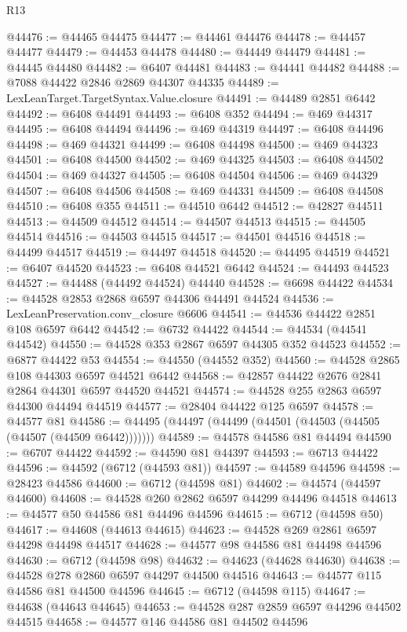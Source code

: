 \begin{lexlean}{R13}
\begin{coremodule}
@44476 := @44465 @44475
@44477 := @44461 @44476
@44478 := @44457 @44477
@44479 := @44453 @44478
@44480 := @44449 @44479
@44481 := @44445 @44480
@44482 := @6407 @44481
@44483 := @44441 @44482
@44488 := @7088 @44422 @2846 @2869 @44307 @44335
@44489 := LexLeanTarget.TargetSyntax.Value.closure
@44491 := @44489 @2851 @6442
@44492 := @6408 @44491
@44493 := @6408 @352
@44494 := @469 @44317
@44495 := @6408 @44494
@44496 := @469 @44319
@44497 := @6408 @44496
@44498 := @469 @44321
@44499 := @6408 @44498
@44500 := @469 @44323
@44501 := @6408 @44500
@44502 := @469 @44325
@44503 := @6408 @44502
@44504 := @469 @44327
@44505 := @6408 @44504
@44506 := @469 @44329
@44507 := @6408 @44506
@44508 := @469 @44331
@44509 := @6408 @44508
@44510 := @6408 @355
@44511 := @44510 @6442
@44512 := @42827 @44511
@44513 := @44509 @44512
@44514 := @44507 @44513
@44515 := @44505 @44514
@44516 := @44503 @44515
@44517 := @44501 @44516
@44518 := @44499 @44517
@44519 := @44497 @44518
@44520 := @44495 @44519
@44521 := @6407 @44520
@44523 := @6408 @44521 @6442
@44524 := @44493 @44523
@44527 := @44488 (@44492 @44524) @44440
@44528 := @6698 @44422
@44534 := @44528 @2853 @2868 @6597 @44306 @44491 @44524
@44536 := LexLeanPreservation.conv_closure @6606
@44541 := @44536 @44422 @2851 @108 @6597 @6442
@44542 := @6732 @44422
@44544 := @44534 (@44541 @44542)
@44550 := @44528 @353 @2867 @6597 @44305 @352 @44523
@44552 := @6877 @44422 @53
@44554 := @44550 (@44552 @352)
@44560 := @44528 @2865 @108 @44303 @6597 @44521 @6442
@44568 := @42857 @44422 @2676 @2841 @2864 @44301 @6597 @44520 @44521
@44574 := @44528 @255 @2863 @6597 @44300 @44494 @44519
@44577 := @28404 @44422 @125 @6597
@44578 := @44577 @81
@44586 := @44495 (@44497 (@44499 (@44501 (@44503 (@44505 (@44507 (@44509 @6442)))))))
@44589 := @44578 @44586 @81 @44494
@44590 := @6707 @44422
@44592 := @44590 @81 @44397
@44593 := @6713 @44422
@44596 := @44592 (@6712 (@44593 @81))
@44597 := @44589 @44596
@44598 := @28423 @44586
@44600 := @6712 (@44598 @81)
@44602 := @44574 (@44597 @44600)
@44608 := @44528 @260 @2862 @6597 @44299 @44496 @44518
@44613 := @44577 @50 @44586 @81 @44496 @44596
@44615 := @6712 (@44598 @50)
@44617 := @44608 (@44613 @44615)
@44623 := @44528 @269 @2861 @6597 @44298 @44498 @44517
@44628 := @44577 @98 @44586 @81 @44498 @44596
@44630 := @6712 (@44598 @98)
@44632 := @44623 (@44628 @44630)
@44638 := @44528 @278 @2860 @6597 @44297 @44500 @44516
@44643 := @44577 @115 @44586 @81 @44500 @44596
@44645 := @6712 (@44598 @115)
@44647 := @44638 (@44643 @44645)
@44653 := @44528 @287 @2859 @6597 @44296 @44502 @44515
@44658 := @44577 @146 @44586 @81 @44502 @44596

\end{coremodule}
\end{lexlean}
